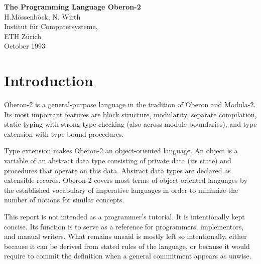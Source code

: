 \newif\ifonline\onlinefalse   %
\newif\ifenglish\englishtrue


\ifonline\title{Oberon-2 Report}\fi

\newif\ifcompact %


\makeindex




\begin{center}
{\large\bf The Programming Language Oberon-2} \\
H.M\"ossenb\"ock, N. Wirth  \\
Institut f\"ur Computersysteme, \\
ETH Z\"urich \\
October 1993 \\
\end{center}

\section{Introduction}

Oberon-2 is a general-purpose language in the tradition of Oberon
and Modula-2. Its most important features are block structure, modularity,
separate compilation, static typing with strong type checking (also
across module boundaries), and type extension with type-bound procedures.

Type extension makes Oberon-2 an object-oriented language. An object
is a variable of an abstract data type consisting of private data
(its state) and procedures that operate on this data. Abstract data
types are declared as extensible records. Oberon-2 covers most terms
of object-oriented languages by the established vocabulary of imperative
languages in order to minimize the number of notions for similar concepts.

This report is not intended as a programmer's tutorial. It is intentionally
kept concise. Its function is to serve as a reference for programmers,
implementors, and manual writers. What remains unsaid is mostly left
so intentionally, either because it can be derived from stated rules
of the language, or because it would require to commit the definition
when a general commitment appears as unwise.

